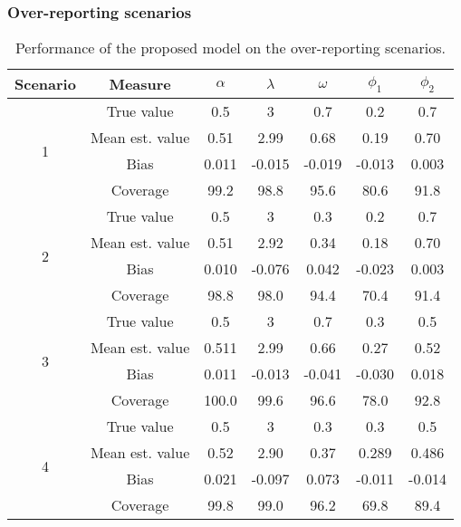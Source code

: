 \documentclass[Afour,sageh,times]{sagej}
\begin{document}
\subsubsection{Over-reporting scenarios}
\begin{table}[ht]\caption{Performance of the proposed model on the over-reporting scenarios.}
  \centering
    \small
     \begin{tabular}{ ccccccc }
      \hline
   \textbf{Scenario} & \textbf{Measure} & \textbf{$\alpha$} & \textbf{$\lambda$} & \textbf{$\omega$} & \textbf{$\phi_1$} & \textbf{$\phi_2$}\\
   \hline
   \multirow{4}{*}{1} & True value & 0.5 & 3 & 0.7 & 0.2 & 0.7 \\
   & Mean est. value & 0.51 & 2.99 & 0.68 & 0.19 & 0.70 \\
   & Bias & 0.011 & -0.015 & -0.019 & -0.013 & 0.003 \\
   & Coverage & 99.2 & 98.8 & 95.6 & 80.6 & 91.8 \\
   \hline
   \multirow{4}{*}{2} & True value & 0.5 & 3 & 0.3 & 0.2 & 0.7 \\
   & Mean est. value & 0.51 & 2.92 & 0.34 & 0.18 & 0.70 \\
   & Bias & 0.010 & -0.076 & 0.042 & -0.023 & 0.003 \\
   & Coverage & 98.8 & 98.0 & 94.4 & 70.4 & 91.4 \\
   \hline
   \multirow{4}{*}{3} & True value & 0.5 & 3 & 0.7 & 0.3 & 0.5 \\
   & Mean est. value & 0.511 & 2.99 & 0.66 & 0.27 & 0.52 \\
   & Bias & 0.011 & -0.013 & -0.041 & -0.030 & 0.018 \\
   & Coverage & 100.0 & 99.6 & 96.6 & 78.0 & 92.8 \\
   \hline
   \multirow{4}{*}{4} & True value & 0.5 & 3 & 0.3 & 0.3 & 0.5 \\
   & Mean est. value & 0.52 & 2.90 & 0.37 & 0.289 & 0.486 \\
   & Bias & 0.021 & -0.097 & 0.073 & -0.011 & -0.014 \\
   & Coverage & 99.8 & 99.0 & 96.2 & 69.8 & 89.4 \\
   \hline
  \end{tabular}
\end{table}
\end{document}
